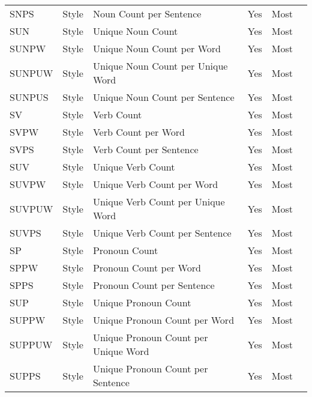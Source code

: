 \begin{longtable}{l l m{} c c m{}}
    SNPS & Style & Noun Count per Sentence & Yes & Most & \cite{Bassani2019_lr359} \\
    SUN & Style & Unique Noun Count & Yes & Most & \cite{Lewoniewski2018_lr149, Bassani2019_lr359} \\
    SUNPW & Style & Unique Noun Count per Word & Yes & Most & \cite{Bassani2019_lr359} \\
    SUNPUW & Style & Unique Noun Count per Unique Word & Yes & Most & \cite{Xu2011_lr30, Bassani2019_lr359} \\
    SUNPUS & Style & Unique Noun Count per Sentence & Yes & Most & \cite{Bassani2019_lr359} \\
    SV & Style & Verb Count & Yes & Most & \cite{Bassani2019_lr359, Olcer2022_lr2017} \\
    SVPW & Style & Verb Count per Word & Yes & Most & \cite{Xu2011_lr30, Bassani2019_lr359} \\
    SVPS & Style & Verb Count per Sentence & Yes & Most & \cite{Bassani2019_lr359} \\
    SUV & Style & Unique Verb Count & Yes & Most & \cite{Lewoniewski2018_lr149, Bassani2019_lr359} \\
    SUVPW & Style & Unique Verb Count per Word & Yes & Most & \cite{Bassani2019_lr359} \\
    SUVPUW & Style & Unique Verb Count per Unique Word & Yes & Most & \cite{Xu2011_lr30, Bassani2019_lr359} \\
    SUVPS & Style & Unique Verb Count per Sentence & Yes & Most & \cite{Bassani2019_lr359} \\
    SP & Style & Pronoun Count & Yes & Most & \cite{Dalip2009_lr14, Wang2020_lr26, Bassani2019_lr359, Dalip2016_lr1002, Dalip2011_lr1003, Dalip2014_lr1004, Magalhaes2019_lr2028} \\
    SPPW & Style & Pronoun Count per Word & Yes & Most & \cite{Anderka2012_lr17, Ferretti2012_lr115, Pereyra2019_lr147, Bassani2019_lr359} \\
    SPPS & Style & Pronoun Count per Sentence & Yes & Most & \cite{Bassani2019_lr359} \\
    SUP & Style & Unique Pronoun Count & Yes & Most & \cite{Bassani2019_lr359} \\
    SUPPW & Style & Unique Pronoun Count per Word & Yes & Most & \cite{Bassani2019_lr359} \\
    SUPPUW & Style & Unique Pronoun Count per Unique Word & Yes & Most & \cite{Bassani2019_lr359} \\
    SUPPS & Style & Unique Pronoun Count per Sentence & Yes & Most & \cite{Bassani2019_lr359} \\

\end{longtable}
